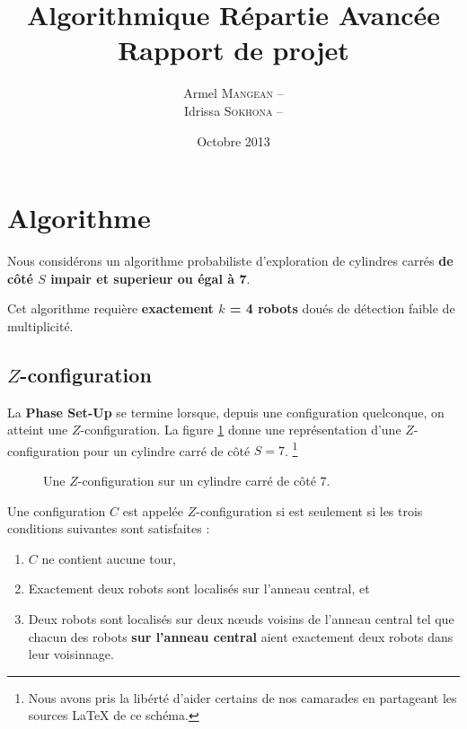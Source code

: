 \documentclass{article}
\title{
  {\bf Algorithmique Répartie Avancée} \\
  Rapport de projet}
\author{
  Armel   \textsc{Mangean} -- \oldstylenums{3262313} \\
  Idrissa \textsc{Sokhona} -- \oldstylenums{3101058}}
\date{Octobre 2013}
\begin{document}
  \maketitle

  \section{Algorithme}
    Nous considérons un algorithme probabiliste d'exploration de cylindres
    carrés {\bf de côté $S$ impair et superieur ou égal à 7}.

    Cet algorithme requière {\bf exactement $k$ = 4 robots} doués de détection faible
    de multiplicité. 

    \subsection{$Z$-configuration}
      La {\bf Phase Set-Up} se termine lorsque, depuis une configuration
      quelconque, on atteint une $Z$-configuration.  La figure
      \ref{fig:z-configuration} donne une représentation d'une $Z$-configuration
      pour un cylindre carré de côté $S = 7$. \footnote{Nous avons pris la
        libérté d'aider certains de nos camarades en partageant les sources
        \LaTeX{} de ce schéma.} \medskip

      \begin{figure}[h]
        \centering
        \caption{Une $Z$-configuration sur un cylindre carré de côté 7.}
        \label{fig:z-configuration}
      \end{figure}

      Une configuration $C$ est appelée $Z$-configuration si est seulement si
      les trois conditions suivantes sont satisfaites :
        \begin{enumerate}
          \item $C$ ne contient aucune tour,
          \item Exactement deux robots sont localisés sur l'anneau central, et
          \item Deux robots sont localisés sur deux n\oe{}uds voisins
            de l'anneau central tel que chacun des robots {\bf sur
              l'anneau central} aient exactement deux robots dans leur
              voisinnage.
        \end{enumerate} \medskip
\end{document}
